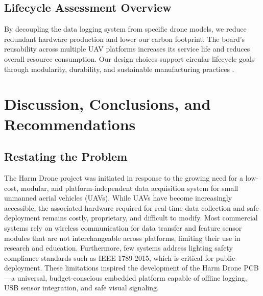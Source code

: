 \documentclass[12pt]{article}
\begin{document}
\subsection{Lifecycle Assessment Overview}

\par By decoupling the data logging system from specific drone models, we reduce redundant hardware production and lower our carbon footprint. The board’s reusability across multiple UAV platforms increases its service life and reduces overall resource consumption. Our design choices support circular lifecycle goals through modularity, durability, and sustainable manufacturing practices \cite{goncalves_uav}.
\section{Discussion, Conclusions, and Recommendations}
\subsection{Restating the Problem}

\par The Harm Drone project was initiated in response to the growing need for a low-cost, modular, and platform-independent data acquisition system for small unmanned aerial vehicles (UAVs). While UAVs have become increasingly accessible, the associated hardware required for real-time data collection and safe deployment remains costly, proprietary, and difficult to modify. Most commercial systems rely on wireless communication for data transfer and feature sensor modules that are not interchangeable across platforms, limiting their use in research and education. Furthermore, few systems address lighting safety compliance standards such as IEEE 1789-2015, which is critical for public deployment. These limitations inspired the development of the Harm Drone PCB—a universal, budget-conscious embedded platform capable of offline logging, USB sensor integration, and safe visual signaling.
\end{document}
